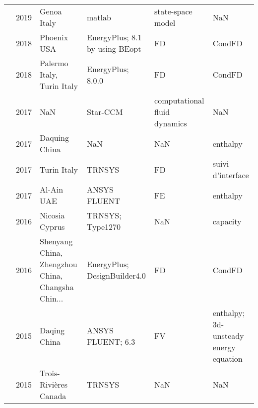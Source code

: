 \begin{tabular}{llllll}
           \cite{Fateh2019} & 2019 &                                        Genoa Italy &                          matlab &             state-space model &                                    NaN \\
      \cite{Wijesuriya2018} & 2018 &                                        Phoenix USA &  EnergyPlus; 8.1 by using BEopt &                            FD &                                 CondFD \\
         \cite{Cascone2018} & 2018 &                         Palermo Italy, Turin Italy &               EnergyPlus; 8.0.0 &                            FD &                                 CondFD \\
            \cite{Yang2017} & 2017 &                                                NaN &                        Star-CCM &  computational fluid dynamics &                                    NaN \\
             \cite{Liu2017} & 2017 &                                      Daquing China &                             NaN &                           NaN &                               enthalpy \\
          \cite{Mazzeo2017} & 2017 &                                        Turin Italy &                          TRNSYS &                            FD &                      suivi d'interface \\
        \cite{Elnajjar2017} & 2017 &                                         Al-Ain UAE &                    ANSYS FLUENT &                            FE &                               enthalpy \\
      \cite{Panayiotou2016} & 2016 &                                     Nicosia Cyprus &                TRNSYS; Type1270 &                           NaN &                               capacity \\
              \cite{Mi2016} & 2016 &  Shenyang China, Zhengzhou China, Changsha Chin... &    EnergyPlus; DesignBuilder4.0 &                            FD &                                 CondFD \\
              \cite{Li2015} & 2015 &                                       Daqing China &               ANSYS FLUENT; 6.3 &                            FV &  enthalpy; 3d-unsteady energy equation \\
         \cite{Bastani2015} & 2015 &                        Trois-Rivi{\`{e}}res Canada &                          TRNSYS &                           NaN &                                    NaN \\

\end{tabular}
